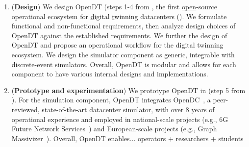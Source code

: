 \begin{enumerate}[label=\textbf{C\arabic*}]
\item \label{introduction:c1} (\textbf{Design}) We design OpenDT (steps 1-4 from \cite{iosup2019atlarge}, the first \underline{open}-source operational ecosystem for \underline{d}igital \underline{t}winning datacenters (). We formulate functional and non-functional requirements, then analyze design choices of OpenDT against the established requirements. We further the design of OpenDT and propose an operational workflow for the digital twinning ecosystem. We design the simulator component as generic, integrable with discrete-event simulators. Overall, OpenDT is modular and allows for each component to have various internal designs and implementations.

\item \label{introduction:c2} (\textbf{Prototype and experimentation}) 
We prototype OpenDT in  (step 5 from \cite{iosup2019atlarge}). For the simulation component, OpenDT integrates OpenDC~\cite{DBLP:conf/ccgrid/MastenbroekAJLB21}, a peer-reviewed, state-of-the-art datacenter simulator, with over 8 years of operational experience and employed in national-scale projects (e.g., 6G Future Network Services~\cite{FutureNetworkServices2025}) and European-scale projects (e.g., Graph Massivizer~\cite{GraphMassivizer2025}). 
Overall, OpenDT enables...
operators
+ researchers
+ students


\end{enumerate}
 



